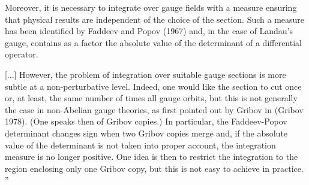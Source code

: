 \begin{description}
Moreover, it is necessary to integrate over gauge fields with a measure ensuring that physical results are independent of the choice of the section. Such a measure has been identified by Faddeev and Popov (1967) and, in the case of Landau's gauge, contains as a factor the absolute value of the determinant of a differential operator.

[...] However, the problem of integration over suitable gauge sections is more subtle at a non-perturbative level. Indeed, one would like the section to cut once or, at least, the same number of times all gauge orbits, but this is not generally the case in non-Abelian gauge theories, as first pointed out by Gribov in (Gribov 1978). (One speaks then of Gribov copies.) In particular, the Faddeev-Popov determinant changes sign when two Gribov copies merge and, if the absolute value of the determinant is not taken into proper account, the integration measure is no longer positive. One idea is then to restrict the integration to the region enclosing only one Gribov copy, but this is not easy to achieve in practice.
''



\end{description}


\renewcommand{\sspRed}{\ensuremath{\hat{\ssp}}}
\renewcommand{\LieEl}{\ensuremath{\gamma}}  %
